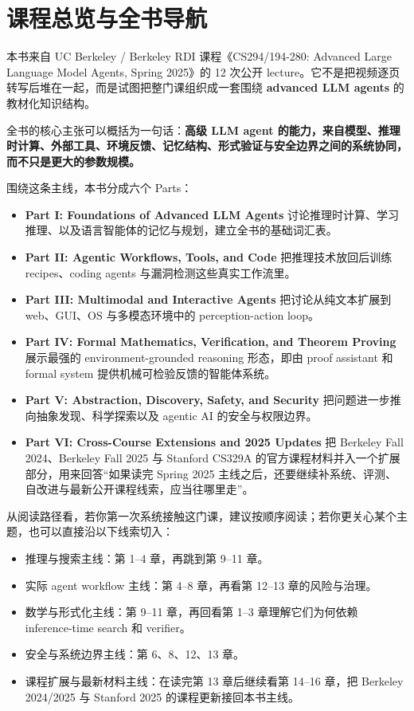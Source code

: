 \chapter{课程总览与全书导航}
\label{chap:course_overview}

本书来自 UC Berkeley / Berkeley RDI 课程《CS294/194-280: Advanced Large Language Model Agents, Spring 2025》的 12 次公开 lecture。它不是把视频逐页转写后堆在一起，而是试图把整门课组织成一套围绕 \textbf{advanced LLM agents} 的教材化知识结构。

全书的核心主张可以概括为一句话：\textbf{高级 LLM agent 的能力，来自模型、推理时计算、外部工具、环境反馈、记忆结构、形式验证与安全边界之间的系统协同，而不只是更大的参数规模。}

围绕这条主线，本书分成六个 Parts：

\begin{itemize}
\item \textbf{Part I: Foundations of Advanced LLM Agents} 讨论推理时计算、学习推理、以及语言智能体的记忆与规划，建立全书的基础词汇表。
\item \textbf{Part II: Agentic Workflows, Tools, and Code} 把推理技术放回后训练 recipes、coding agents 与漏洞检测这些真实工作流里。
\item \textbf{Part III: Multimodal and Interactive Agents} 把讨论从纯文本扩展到 web、GUI、OS 与多模态环境中的 perception-action loop。
\item \textbf{Part IV: Formal Mathematics, Verification, and Theorem Proving} 展示最强的 environment-grounded reasoning 形态，即由 proof assistant 和 formal system 提供机械可检验反馈的智能体系统。
\item \textbf{Part V: Abstraction, Discovery, Safety, and Security} 把问题进一步推向抽象发现、科学探索以及 agentic AI 的安全与权限边界。
\item \textbf{Part VI: Cross-Course Extensions and 2025 Updates} 把 Berkeley Fall 2024、Berkeley Fall 2025 与 Stanford CS329A 的官方课程材料并入一个扩展部分，用来回答“如果读完 Spring 2025 主线之后，还要继续补系统、评测、自改进与最新公开课程线索，应当往哪里走”。
\end{itemize}

从阅读路径看，若你第一次系统接触这门课，建议按顺序阅读；若你更关心某个主题，也可以直接沿以下线索切入：

\begin{itemize}
\item 推理与搜索主线：第 1--4 章，再跳到第 9--11 章。
\item 实际 agent workflow 主线：第 4--8 章，再看第 12--13 章的风险与治理。
\item 数学与形式化主线：第 9--11 章，再回看第 1--3 章理解它们为何依赖 inference-time search 和 verifier。
\item 安全与系统边界主线：第 6、8、12、13 章。
\item 课程扩展与最新材料主线：在读完第 13 章后继续看第 14--16 章，把 Berkeley 2024/2025 与 Stanford 2025 的课程更新接回本书主线。
\end{itemize}

